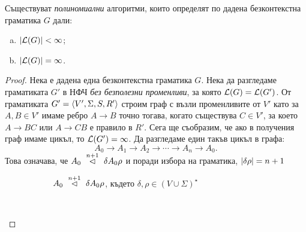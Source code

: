 \begin{theorem}
  Съществуват \emph{полиномиални} алгоритми, които определят по дадена безконтекстна граматика $G$ дали:
  \begin{enumerate}[a)]
  \item
    $\vert{\mathcal{L}(G)}\vert < \infty$;
  \item
    $\vert{\mathcal{L}(G)}\vert = \infty$.
  \end{enumerate}
\end{theorem}
\begin{proof}
  Нека е дадена една безконтекстна граматика $G$.
  Нека да разгледаме граматиката $G'$ в НФЧ {\em без безполезни променливи}, за която $\mathcal{L}(G) = \mathcal{L}(G')$.
  От граматиката $G' = \langle{V',\Sigma,S,R'}\rangle$ строим граф с възли променливите от $V'$ като
  за $A,B \in V'$ имаме ребро $A \to B$ точно тогава, когато съществува $C \in V'$,
  за което $A \to BC$ или $A \to CB$ е правило в $R'$.
  Сега ще съобразим, че ако в получения граф имаме цикъл, то $\mathcal{L}(G') = \infty$.
  Да разгледаме един такъв цикъл в графа:
  \[A_0 \to A_1 \to A_2 \to \cdots \to A_n \to A_0.\]
  Това означава, че $A_0 ~\stackrel{{n+1}}{\lhd}~ \delta A_0 \rho$ и поради избора на граматика, $\vert{\delta\rho}\vert = n+1$

  \begin{figure}[H]
    \begin{subfigure}[t]{0.5\textwidth}
    \centering
    \caption{\scriptsize{$A_0 ~\stackrel{{n+1}}{\lhd}~ \delta A_0 \rho$, където $\delta, \rho \in (V\cup\Sigma)^\star$}}
    \end{subfigure}
    ~ 
    \begin{subfigure}[t]{0.5\textwidth}
      \centering
\end{subfigure}
\end{figure}
\end{proof}
